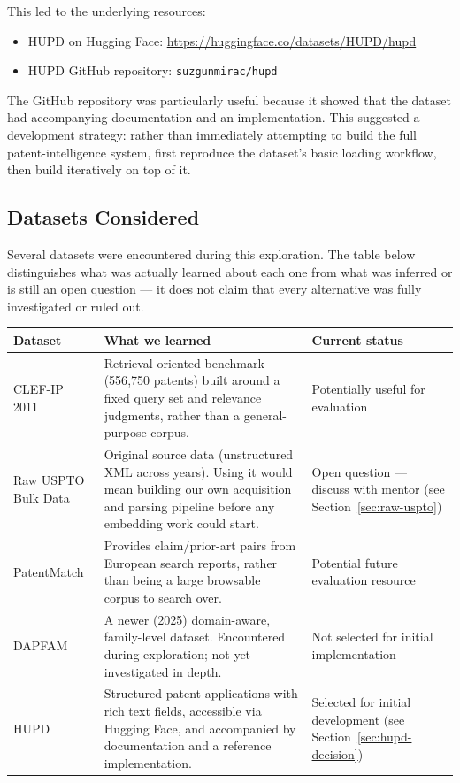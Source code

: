 \documentclass[11pt]{article}
\begin{document}
\noindent This led to the underlying resources:

\begin{itemize}
    \item HUPD on Hugging Face: \url{https://huggingface.co/datasets/HUPD/hupd}
    \item HUPD GitHub repository: \texttt{suzgunmirac/hupd}
\end{itemize}

\noindent The GitHub repository was particularly useful because it showed that the dataset had accompanying documentation and an implementation. This suggested a development strategy: rather than immediately attempting to build the full patent-intelligence system, first reproduce the dataset's basic loading workflow, then build iteratively on top of it.

\subsection{Datasets Considered}

Several datasets were encountered during this exploration. The table below distinguishes what was actually learned about each one from what was inferred or is still an open question --- it does not claim that every alternative was fully investigated or ruled out.

\begin{longtable}{|p{2.7cm}|p{6.3cm}|p{3.2cm}|}
\hline
\textbf{Dataset} & \textbf{What we learned} & \textbf{Current status} \\
\hline
\endhead
CLEF-IP 2011 & Retrieval-oriented benchmark (556{,}750 patents) built around a fixed query set and relevance judgments, rather than a general-purpose corpus. & Potentially useful for evaluation \\
\hline
Raw USPTO Bulk Data & Original source data (unstructured XML across years). Using it would mean building our own acquisition and parsing pipeline before any embedding work could start. & Open question --- discuss with mentor (see Section~\ref{sec:raw-uspto}) \\
\hline
PatentMatch & Provides claim/prior-art pairs from European search reports, rather than being a large browsable corpus to search over. & Potential future evaluation resource \\
\hline
DAPFAM & A newer (2025) domain-aware, family-level dataset. Encountered during exploration; not yet investigated in depth. & Not selected for initial implementation \\
\hline
HUPD & Structured patent applications with rich text fields, accessible via Hugging Face, and accompanied by documentation and a reference implementation. & Selected for initial development (see Section~\ref{sec:hupd-decision}) \\
\hline
\end{longtable}
\end{document}
